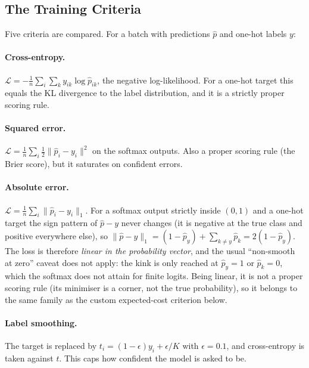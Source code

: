 \documentclass[11pt]{article}
\newcommand{\Lc}{\mathcal{L}}
\begin{document}
\subsection{The Training Criteria}
\label{sec:criteria}

Five criteria are compared. For a batch with predictions $\hat p$ and one-hot labels $y$:

\paragraph{Cross-entropy.}
$\Lc=-\frac1n\sum_i\sum_k y_{ik}\log\hat p_{ik}$, the negative log-likelihood. For a one-hot
target this equals the KL divergence to the label distribution, and it is a strictly proper
scoring rule.

\paragraph{Squared error.} $\Lc=\frac1n\sum_i\tfrac12\lVert \hat p_i-y_i\rVert^2$ on the softmax
outputs. Also a proper scoring rule (the Brier score), but it saturates on confident errors.

\paragraph{Absolute error.} $\Lc=\frac1n\sum_i\lVert \hat p_i-y_i\rVert_1$. For a softmax output
strictly inside $(0,1)$ and a one-hot target the sign pattern of $\hat p-y$ never changes (it is
negative at the true class and positive everywhere else), so
$\lVert \hat p-y\rVert_1=(1-\hat p_y)+\sum_{k\ne y}\hat p_k=2(1-\hat p_y)$. The loss is therefore
\emph{linear in the probability vector}, and the usual ``non-smooth at zero'' caveat does not
apply: the kink is only reached at $\hat p_y=1$ or $\hat p_k=0$, which the softmax does not
attain for finite logits. Being linear, it is not a proper scoring rule (its minimiser is a
corner, not the true probability), so it belongs to the same family as the custom expected-cost
criterion below.

\paragraph{Label smoothing.} The target is replaced by
$t_i=(1-\epsilon)y_i+\epsilon/K$ with $\epsilon=0.1$, and cross-entropy is taken against $t$.
This caps how confident the model is asked to be.
\end{document}
